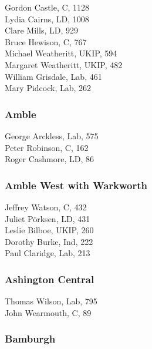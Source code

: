 \documentclass[a4paper,openany,10pt]{book}
\begin{document}


Gordon Castle, C, 1128\\
Lydia Cairns, LD, 1008\\
Clare Mills, LD, 929\\
Bruce Hewison, C, 767\\
Michael Weatheritt, UKIP, 594\\
Margaret Weatheritt, UKIP, 482\\
William Grisdale, Lab, 461\\
Mary Pidcock, Lab, 262\\


\subsubsection*{Amble}



George Arckless, Lab, 575\\
Peter Robinson, C, 162\\
Roger Cashmore, LD, 86\\


\subsubsection*{Amble West with Warkworth}



Jeffrey Watson, C, 432\\
Juliet Pörksen, LD, 431\\
Leslie Bilboe, UKIP, 260\\
Dorothy Burke, Ind, 222\\
Paul Claridge, Lab, 213\\


\subsubsection*{Ashington Central}



Thomas Wilson, Lab, 795\\
John Wearmouth, C, 89\\


\subsubsection*{Bamburgh}
\end{document}
